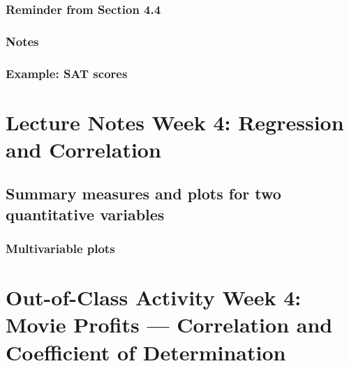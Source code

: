 \documentclass[
]{report}
\begin{document}
\hypertarget{reminder-from-section-4.4}{%
\subsubsection*{Reminder from Section 4.4}\label{reminder-from-section-4.4}}

\hypertarget{notes-12}{%
\subsubsection*{Notes}\label{notes-12}}

\hypertarget{example-sat-scores}{%
\subsubsection*{Example: SAT scores}\label{example-sat-scores}}

\hypertarget{lecture-notes-week-4-regression-and-correlation}{%
\section{Lecture Notes Week 4: Regression and Correlation}\label{lecture-notes-week-4-regression-and-correlation}}

\hypertarget{summary-measures-and-plots-for-two-quantitative-variables}{%
\subsection*{Summary measures and plots for two quantitative variables}\label{summary-measures-and-plots-for-two-quantitative-variables}}

\hypertarget{multivariable-plots}{%
\subsubsection*{Multivariable plots}\label{multivariable-plots}}

\hypertarget{out-of-class-activity-week-4-movie-profits-correlation-and-coefficient-of-determination}{%
\section{Out-of-Class Activity Week 4: Movie Profits --- Correlation and Coefficient of Determination}\label{out-of-class-activity-week-4-movie-profits-correlation-and-coefficient-of-determination}}
\end{document}
